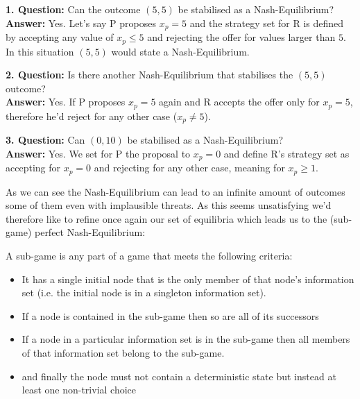 \begin{example}
	\textbf{1. Question:} Can the outcome $(5, 5)$ be stabilised as a Nash-Equilibrium? \\
	\textbf{Answer:} Yes. Let's say P proposes $x_{p} = 5$ and the strategy set for R is defined by accepting any value of $x_{p} \leq 5$ and rejecting the offer for values larger than $5$. \\
		In this situation $(5, 5)$ would state a Nash-Equilibrium.


	\textbf{2. Question:} Is there another Nash-Equilibrium that stabilises the $(5, 5)$ outcome? \\
	\textbf{Answer:} Yes. If P proposes $x_{p} = 5$ again and  R accepts the offer only for $x_{p} = 5$, therefore he'd reject for any other case ($x_{p} \neq 5$). 
	
	
	\textbf{3. Question:} Can $(0, 10)$ be stabilised as a Nash-Equilibrium? \\
	\textbf{Answer:} Yes. We set for P the proposal to $x_{p} = 0$ and define R's strategy set as accepting for $x_{p} = 0$ and rejecting for any other case, meaning for $x_{p} \geq 1$. 
\end{example}
As we can see the Nash-Equilibrium can lead to an infinite amount of outcomes some of them even with implausible threats. As this seems unsatisfying we'd therefore like to refine once again our set of equilibria which leads us to the (sub-game) perfect Nash-Equilibrium:

\begin{definition} 
	A sub-game is any part of a game that meets the following criteria:
	\begin{itemize}
		\item It has a single initial node that is the only member of that node's information set (i.e. the initial node is in a singleton information set).
		\item If a node is contained in the sub-game then so are all of its successors
		\item If a node in a particular information set is in the sub-game then all members of that information set belong to the sub-game.
		\item and finally the node must not contain a deterministic state but instead at least one non-trivial choice
	\end{itemize}
\end{definition}

